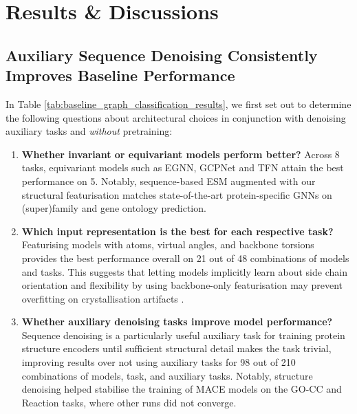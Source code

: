 \section{Results \& Discussions}

\subsection{Auxiliary Sequence Denoising Consistently Improves Baseline Performance}

In Table \ref{tab:baseline_graph_classification_results}, we first set out to determine the following questions about architectural choices in conjunction with denoising auxiliary tasks and \textit{without} pretraining:
\begin{enumerate}
    \item \textbf{Whether invariant or equivariant models perform better?} Across 8 tasks, equivariant models such as EGNN, GCPNet and TFN attain the best performance on 5.
    Notably, sequence-based ESM augmented with our structural featurisation matches state-of-the-art protein-specific GNNs \citep{fan2023continuousdiscrete} on (super)family and gene ontology prediction.
    \item \textbf{Which input representation is the best for each respective task?} Featurising models with \caa atoms, virtual angles, and backbone torsions provides the best performance overall on 21 out of 48 combinations of models and tasks. This suggests that letting models implicitly learn about side chain orientation and flexibility by using backbone-only featurisation may prevent overfitting on crystallisation artifacts \citep{Dauparas2022}.
    \item \textbf{Whether auxiliary denoising tasks improve model performance?} Sequence denoising is a particularly useful auxiliary task for training protein structure encoders until sufficient structural detail makes the task trivial, improving results over not using auxiliary tasks for 98 out of 210 combinations of models, task, and auxiliary tasks.
    Notably, structure denoising helped stabilise the training of MACE models on the GO-CC and Reaction tasks, where other runs did not converge.
\end{enumerate}


